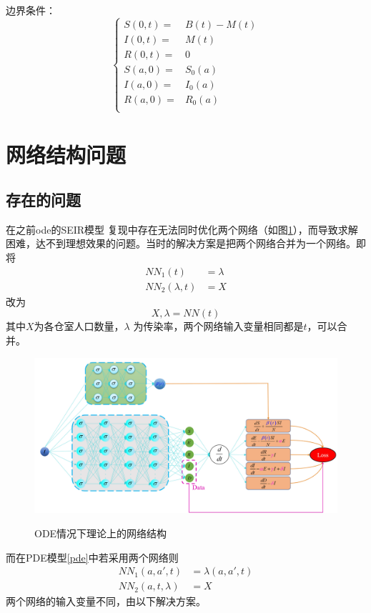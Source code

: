 \documentclass{article}
\numberwithin{figure}{section}
\numberwithin{equation}{section}
\numberwithin{table}{section}
\begin{document}
边界条件：
\begin{equation}
\left\{
\begin{aligned}
S(0,t)=&B(t)-M(t)\\
I(0,t)=&M(t)\\
R(0,t)=&0\\
S(a,0)=&S_0(a)\\
I(a,0)=&I_0(a)\\
R(a,0)=&R_0(a)\\
\end{aligned}
\right.
\end{equation}

\section{网络结构问题} \label{problem}
\subsection{存在的问题}
在之前ode的SEIR模型\cite{he2023transmission} 复现中存在无法同时优化两个网络（如图\ref{ode-nn}），而导致求解困难，达不到理想效果的问题。当时的解决方案是把两个网络合并为一个网络。即将
\begin{equation}
\begin{aligned}
NN_1(t)&=\lambda\\
NN_2(\lambda,t)&=X
\end{aligned}
\end{equation}
改为
\begin{equation}
    X,\lambda=NN(t)
\end{equation}
其中$X$为各仓室人口数量，$\lambda$ 为传染率，两个网络输入变量相同都是$t$，可以合并。
\begin{figure}[htbp]
    \centering
    \includegraphics[width=0.8\linewidth]{img/seir.png}\label{ode-nn}
    \caption{ODE情况下理论上的网络结构}
\end{figure}
而在PDE模型\eqref{pde}中若采用两个网络则
\begin{equation}
\begin{aligned}\label{p1}
    NN_1(a,a',t)&=\lambda(a,a',t)\\
    NN_2(a,t,\lambda)&=X
\end{aligned}
\end{equation}
两个网络的输入变量不同，由以下解决方案。
\end{document}
